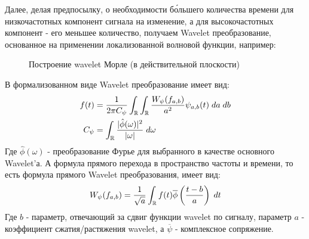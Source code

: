 Далее, делая предпосылку, о необходимости б\'{о}льшего количества времени для низкочастотных компонент сигнала на изменение, а для высокочастотных компонент - его меньшее количество, получаем Wavelet преобразование, основанное на применении локализованной волновой функции, например:
\begin{figure}[H]
	\centering
	\caption{Построение wavelet Морле (в действительной плоскости)}
\end{figure}
В формализованном виде Wavelet преобразование имеет вид:
\begin{equation}
	\begin{split}
		f(t) & = \frac{1}{2\pi C_{\psi}} \int_{\mathbb{R}} \int_{\mathbb{R}} \frac{W_{\psi}(f_{a, b})}{a^2}\psi_{a, b}(t) \; da \; db\\
		C_{\psi} & = \int_{\mathbb{R}} \frac{|\hat{\phi}(\omega)|^2}{|\omega|} \; d \omega
	\end{split}
\end{equation}
Где $\hat{\phi}(\omega)$ - преобразование Фурье для выбранного в качестве основного Wavelet'а. А формула прямого перехода в пространство частоты и времени, то есть формула прямого Wavelet преобразования, имеет вид:
\begin{equation}
	W_{\psi}(f_{a, b}) = \frac{1}{\sqrt{a}}\int_{\mathbb{R}}f(t) \overline{\phi}\left( \frac{t - b}{a} \right) \; dt
\end{equation}
Где $b$ - параметр, отвечающий за сдвиг функции wavelet по сигналу, параметр $a$ - коэффициент сжатия/растяжения wavelet, а $\overline{\psi}$ - комплексное сопряжение.


